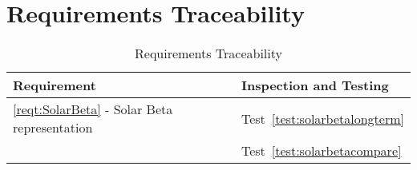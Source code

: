 \section{Requirements Traceability}

\begin{longtable}[c]{||p{3.5in}|p{3.5in}|}
\caption{Requirements Traceability} \\[6pt]
\hline
{\bf Requirement} & {\bf Inspection and Testing} \\ 
\hline \hline
\endhead
\ref{reqt:SolarBeta} - Solar Beta representation &
  Test~\ref{test:solarbetalongterm} \\ 
  & Test~\ref{test:solarbetacompare} \\ \hline

\end{longtable}

